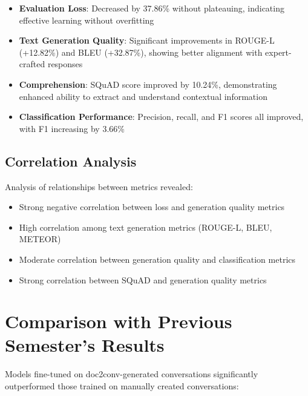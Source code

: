 \begin{itemize}
    \item \textbf{Evaluation Loss}: Decreased by 37.86\% without plateauing, indicating effective learning without overfitting
    
    \item \textbf{Text Generation Quality}: Significant improvements in ROUGE-L (+12.82\%) and BLEU (+32.87\%), showing better alignment with expert-crafted responses
    
    \item \textbf{Comprehension}: SQuAD score improved by 10.24\%, demonstrating enhanced ability to extract and understand contextual information
    
    \item \textbf{Classification Performance}: Precision, recall, and F1 scores all improved, with F1 increasing by 3.66\%
\end{itemize}

\subsection{Correlation Analysis}

Analysis of relationships between metrics revealed:

\begin{itemize}
    \item Strong negative correlation between loss and generation quality metrics
    \item High correlation among text generation metrics (ROUGE-L, BLEU, METEOR)
    \item Moderate correlation between generation quality and classification metrics
    \item Strong correlation between SQuAD and generation quality metrics
\end{itemize}

\section{Comparison with Previous Semester's Results}

Models fine-tuned on doc2conv-generated conversations significantly outperformed those trained on manually created conversations:

